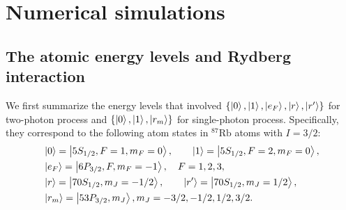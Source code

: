 \chapter{Numerical simulations}


\section{The atomic energy levels and Rydberg interaction}
We first summarize the energy levels that involved 
$\{\ket{0},\ket{1},\ket{e_F},\ket{r},\ket{r'}\}$ for two-photon process
and $\{\ket{0},\ket{1},\ket{r_m}\}$ for single-photon process.
Specifically, they correspond to the following atom states in $^{87}\mathrm{Rb}$ atoms with $I = 3/2$:
\begin{align}
&\ket 0=\ket{5S_{1/2},F=1,m_F=0},\qquad\ket1=\ket{5S_{1/2},F=2,m_F=0},\\
&\ket{e_{F}}=\ket{6P_{3/2},F,m_F=-1},\quad F=1,2,3,\\
&\ket r=\ket{70S_{1/2},m_J=-1/2}, \qquad\ket{r'}=\ket{70S_{1/2},m_J=1/2},\\
&  \ket{r_m}=\ket{53P_{3/2},m_J}, m_J = -3/2,-1/2,1/2,3/2.
\end{align}

